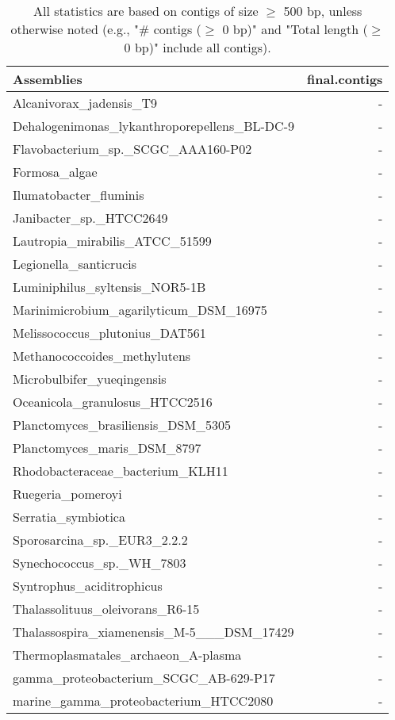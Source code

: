 \documentclass[12pt,a4paper]{article}
\begin{document}
\begin{table}[ht]
\begin{center}
\caption{All statistics are based on contigs of size $\geq$ 500 bp, unless otherwise noted (e.g., "\# contigs ($\geq$ 0 bp)" and "Total length ($\geq$ 0 bp)" include all contigs).}
\begin{tabular}{|l*{1}{|r}|}
\hline
Assemblies & final.contigs \\ \hline
Alcanivorax\_jadensis\_T9 & - \\ \hline
Dehalogenimonas\_lykanthroporepellens\_BL-DC-9 & - \\ \hline
Flavobacterium\_sp.\_SCGC\_AAA160-P02 & - \\ \hline
Formosa\_algae & - \\ \hline
Ilumatobacter\_fluminis & - \\ \hline
Janibacter\_sp.\_HTCC2649 & - \\ \hline
Lautropia\_mirabilis\_ATCC\_51599 & - \\ \hline
Legionella\_santicrucis & - \\ \hline
Luminiphilus\_syltensis\_NOR5-1B & - \\ \hline
Marinimicrobium\_agarilyticum\_DSM\_16975 & - \\ \hline
Melissococcus\_plutonius\_DAT561 & - \\ \hline
Methanococcoides\_methylutens & - \\ \hline
Microbulbifer\_yueqingensis & - \\ \hline
Oceanicola\_granulosus\_HTCC2516 & - \\ \hline
Planctomyces\_brasiliensis\_DSM\_5305 & - \\ \hline
Planctomyces\_maris\_DSM\_8797 & - \\ \hline
Rhodobacteraceae\_bacterium\_KLH11 & - \\ \hline
Ruegeria\_pomeroyi & - \\ \hline
Serratia\_symbiotica & - \\ \hline
Sporosarcina\_sp.\_EUR3\_2.2.2 & - \\ \hline
Synechococcus\_sp.\_WH\_7803 & - \\ \hline
Syntrophus\_aciditrophicus & - \\ \hline
Thalassolituus\_oleivorans\_R6-15 & - \\ \hline
Thalassospira\_xiamenensis\_M-5\_\_\_DSM\_17429 & - \\ \hline
Thermoplasmatales\_archaeon\_A-plasma & - \\ \hline
gamma\_proteobacterium\_SCGC\_AB-629-P17 & - \\ \hline
marine\_gamma\_proteobacterium\_HTCC2080 & - \\ \hline
\end{tabular}
\end{center}
\end{table}
\end{document}
